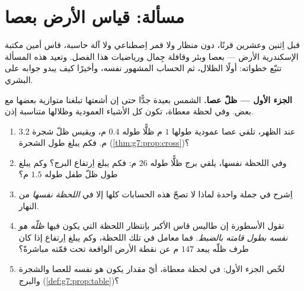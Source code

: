 \section{مسألة: قياس الأرض بعصا}

\begin{problem}
\label{pb:g7:prop:1}
قبل اِثنين وعشرين قرنًا، دون منظار ولا قمر اِصطناعي ولا
آلة حاسبة، قاس أمين مكتبة الإسكندرية الأرض ---
بعصا وبئر وقافلة جِمال ورياضيات هذا
الفصل. وتعيد هذه المسألة تتبّع خطواته: أولًا
 الظلال، ثم الحساب المشهور نفسه،
وأخيرًا كيف يبدو جوابه على  البشري.

\medskip
\noindent\textbf{الجزء الأول --- ظلّ عصا.}
الشمس بعيدة جدًّا حتى إن أشعتها تبلغنا متوازية بعضها
مع بعض. وفي لحظة معطاة، تكون كل الأشياء العمودية وظلالها
متناسبة إذن.
\begin{enumerate}
  \item عند الظهر، تلقي عصا عمودية طولها $1$ م ظلًّا طوله
        $0.4$ م، ويقيس ظلّ شجرة $3.2$ م. فكم يبلغ طول
        الشجرة (\cref{thm:g7:prop:cross})؟
  \item وفي اللحظة نفسها، يلقي برج ظلًّا طوله $26$ م: فكم
        يبلغ اِرتفاع البرج؟ وكم يبلغ طول ظلّ طفل
        طوله $1.5$ م؟
  \item اِشرح في جملة واحدة لماذا لا تصحّ هذه الحسابات كلها
        إلا في \emph{اللحظة نفسها} من النهار.
  \item تقول الأسطورة إن طاليس قاس  الأكبر باِنتظار
        اللحظة التي يكون فيها \emph{ظلّه هو نفسه بطول
        قامته بالضبط}. فما معامل 
        في تلك اللحظة، وكم يبلغ اِرتفاع 
        إذا كان طرف ظلّه يبعد $147$ م عن نقطة
        الأرض الواقعة تحت قمّته مباشرةً؟
  \item لخّص الجزء الأول: في لحظة معطاة، أيّ مقدار يكون
        هو نفسه للعصا والشجرة والبرج
         (\cref{def:g7:prop:table})؟
\end{enumerate}


\end{problem}
